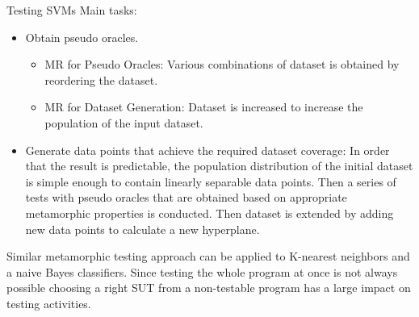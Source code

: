 Testing SVMs
Main tasks:
\begin{itemize}
  \item Obtain pseudo oracles.
  \begin{itemize}
    \item MR for Pseudo Oracles: Various combinations of dataset is obtained by reordering the dataset.
    \item MR for Dataset Generation: Dataset is increased to increase the population of the input dataset.
  \end{itemize}
  \item Generate data points that achieve the required dataset coverage: In order that the result is predictable, the population distribution of the initial dataset is simple enough to contain linearly separable data points. Then a series of tests with pseudo oracles that are obtained based on appropriate metamorphic properties is conducted. Then dataset is extended by adding new data points to calculate a new hyperplane.
\end{itemize}
Similar metamorphic testing approach can be applied to K-nearest neighbors and a naive Bayes classifiers. Since testing the whole program at once is not always possible choosing a right SUT from a non-testable program has a large impact on testing activities.
